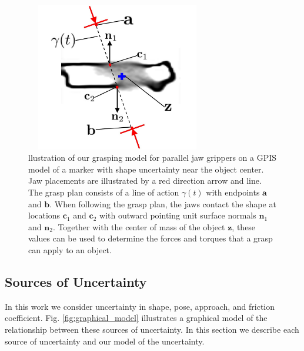 \documentclass[journal,transmag]{IEEEtran}%
\newcommand{\ba}{\mathbf{a}}
\newcommand{\bb}{\mathbf{b}}
\newcommand{\bc}{\mathbf{c}}
\newcommand{\bn}{\mathbf{n}}
\newcommand{\bz}{\mathbf{z}}
\begin{document}

\begin{figure}[t!]
\centering
\includegraphics[width = 8cm, height = 6.5cm]{figures/grasp_model.jpg}
\caption{llustration of our grasping model for parallel jaw grippers on a GPIS model of a marker with shape uncertainty near the object center. Jaw placements are illustrated by a red direction arrow and line. The grasp plan consists of a line of action $\gamma(t)$ with endpoints $\ba$ and $\bb$. When following the grasp plan, the jaws contact the shape at locations $\bc_1$ and $\bc_2$ with outward pointing unit surface normals $\bn_1$ and $\bn_2$. Together with the center of mass of the object $\bz$, these values can be used to determine the forces and torques that a grasp can apply to an object.}
\vspace*{-4ex}
\label{fig:grasp_model}
\end{figure}

\subsection{Sources of Uncertainty}
In this work we consider uncertainty in shape, pose, approach, and friction coefficient.
Fig. \ref{fig:graphical_model} illustrates a graphical model of the relationship between these sources of uncertainty.
In this section we describe each source of uncertainty and our model of the uncertainty.
\end{document}
